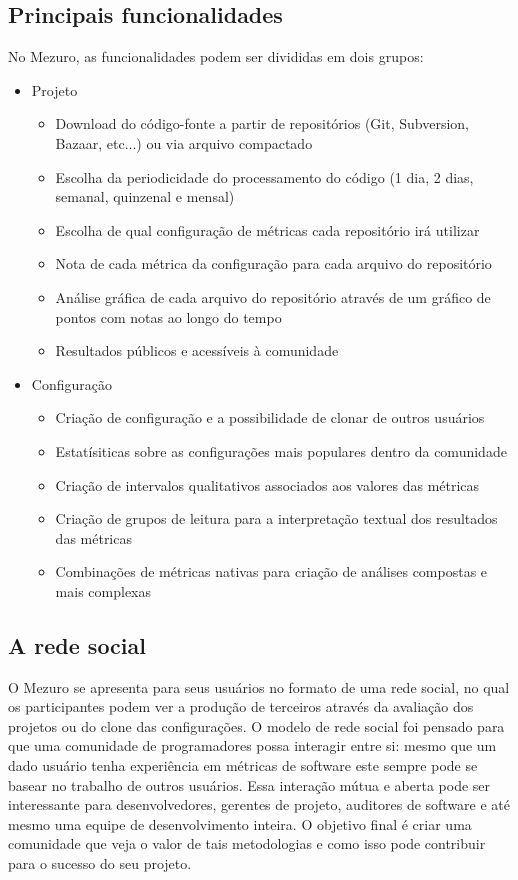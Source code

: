 \documentclass[12pt]{article}
\begin{document}
  \subsection{Principais funcionalidades}\label{sec:princ-funcionalidades}
  No Mezuro, as funcionalidades podem ser divididas em dois grupos:

  \begin{itemize}
    \item Projeto
      \begin{itemize}
      \item Download do código-fonte a partir de repositórios (Git, Subversion, Bazaar, etc...) ou via arquivo compactado
          \item Escolha da periodicidade do processamento do código (1 dia, 2 dias, semanal, quinzenal e mensal)
          \item Escolha de qual configuração de métricas cada repositório irá utilizar
          \item Nota de cada métrica da configuração para cada arquivo do repositório
          \item Análise gráfica de cada arquivo do repositório através de um gráfico de pontos com notas ao longo do tempo
          \item Resultados públicos e acessíveis à comunidade
      \end{itemize}
      \item Configuração
      \begin{itemize}
      \item Criação de configuração e a possibilidade de clonar de outros usuários
          \item Estatísiticas sobre as configurações mais populares dentro da comunidade
          \item Criação de intervalos qualitativos associados aos valores das métricas
          \item Criação de grupos de leitura para a interpretação textual dos resultados das métricas
          \item Combinações de métricas nativas para criação de análises compostas e mais complexas
      \end{itemize}
  \end{itemize}

  \subsection{A rede social}\label{sec:user-potencial}
  O Mezuro se apresenta para seus usuários no formato de uma rede social, no qual os participantes podem ver a produção de terceiros através da avaliação dos projetos ou do clone das configurações. O modelo de rede social foi pensado para que uma comunidade de programadores possa interagir entre si: mesmo que um dado usuário tenha experiência em métricas de software este sempre pode se basear no trabalho de outros usuários. Essa interação mútua e aberta pode ser interessante para desenvolvedores, gerentes de projeto, auditores de software e até mesmo uma equipe de desenvolvimento inteira. O objetivo final é criar uma comunidade que veja o valor de tais metodologias e como isso pode contribuir para o sucesso do seu projeto.
\end{document}
